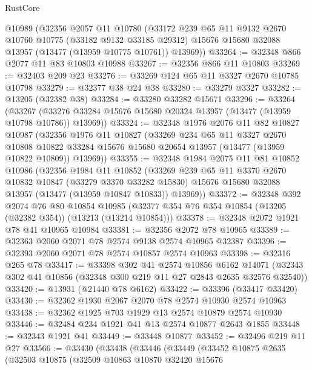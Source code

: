 \begin{lexlean}{RustCore}
\begin{coremodule}
    @10989
    (@32356
      @2057
      @11
      @10780
      (@33172
        @239
        @65
        @11
        @9132
        @2670
        @10760
        @10775
        (@33182 @9132 @33185 @29312)
        @15676
        @15680
        @32088
        @13957
        (@13477 (@13959 @10775 @10761))
        @13969))
@33264 := @32348 @866 @2077 @11 @83 @10803 @10988
@33267 := @32356 @866 @11 @10803
@33269 := @32403 @209 @23
@33276 := @33269 @124 @65 @11 @3327 @2670 @10785 @10798
@33279 := @32377 @38 @24 @38
@33280 := @33279 @3327
@33282 := @13205 (@32382 @38)
@33284 := @33280 @33282 @15671
@33296 := @33264
    (@33267 (@33276 @33284 @15676 @15680 @20324 @13957 (@13477 (@13959 @10798 @10786)) @13969))
@33324 := @32348
    @1976
    @2076
    @11
    @82
    @10827
    @10987
    (@32356
      @1976
      @11
      @10827
      (@33269
        @234
        @65
        @11
        @3327
        @2670
        @10808
        @10822
        @33284
        @15676
        @15680
        @20654
        @13957
        (@13477 (@13959 @10822 @10809))
        @13969))
@33355 := @32348
    @1984
    @2075
    @11
    @81
    @10852
    @10986
    (@32356
      @1984
      @11
      @10852
      (@33269
        @239
        @65
        @11
        @3370
        @2670
        @10832
        @10847
        (@33279 @3370 @33282 @15830)
        @15676
        @15680
        @32088
        @13957
        (@13477 (@13959 @10847 @10833))
        @13969))
@33372 := @32348
    @392
    @2074
    @76
    @80
    @10854
    @10985
    (@32377 @354 @76 @354 @10854 (@13205 (@32382 @354)) (@13213 (@13214 @10854)))
@33378 := @32348 @2072 @1921 @78 @41 @10965 @10984
@33381 := @32356 @2072 @78 @10965
@33389 := @32363 @2060 @2071 @78 @2574 @9138 @2574 @10965 @32387
@33396 := @32393 @2060 @2071 @78 @2574 @10857 @2574 @10963
@33398 := @32316 @265 @78
@33417 := @33398
    @302
    @41
    @2574
    @10856
    @6162
    @14071
    (@32343 @302 @41 @10856 (@32348 @300 @219 @11 @27 @2843 @2635 @32576 @32540))
@33420 := @13931 (@21440 @78 @6162)
@33422 := @33396 (@33417 @33420)
@33430 := @32362 @1930 @2067 @2070 @78 @2574 @10930 @2574 @10963
@33438 := @32362 @1925 @703 @1929 @13 @2574 @10879 @2574 @10930
@33446 := @32484 @234 @1921 @41 @13 @2574 @10877 @2643 @1855
@33448 := @32343 @1921 @41
@33449 := @33448 @10877
@33452 := @32496 @219 @11 @27
@33566 := @33430
    (@33438
      (@33446
        (@33449
          (@33452
            @10875
            @2635
            (@32503
              @10875
              (@32509
                @10863
                @10870
                @32420
                @15676

\end{coremodule}
\end{lexlean}
